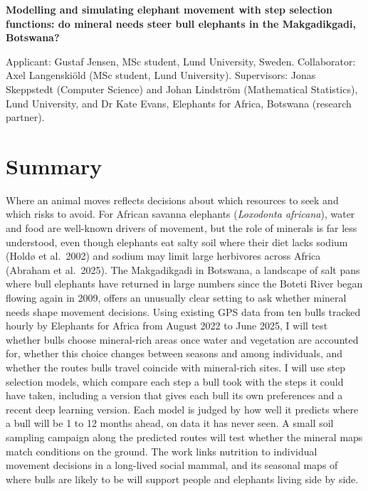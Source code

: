 \documentclass[11pt,a4paper]{article}
\begin{document}
{\bfseries Modelling and simulating elephant movement with step selection functions: do mineral needs steer bull elephants in the Makgadikgadi, Botswana?\par}
\vspace{2pt}
Applicant: Gustaf Jensen, MSc student, Lund University, Sweden. Collaborator: Axel Langenskiöld (MSc student, Lund University). Supervisors: Jonas Skeppstedt (Computer Science) and Johan Lindström (Mathematical Statistics), Lund University, and Dr Kate Evans, Elephants for Africa, Botswana (research partner).

\section{Summary}
Where an animal moves reflects decisions about which resources to seek and which risks to avoid. For African savanna elephants (\textit{Loxodonta africana}), water and food are well-known drivers of movement, but the role of minerals is far less understood, even though elephants eat salty soil where their diet lacks sodium (Holdø et al.\ 2002) and sodium may limit large herbivores across Africa (Abraham et al.\ 2025). The Makgadikgadi in Botswana, a landscape of salt pans where bull elephants have returned in large numbers since the Boteti River began flowing again in 2009, offers an unusually clear setting to ask whether mineral needs shape movement decisions. Using existing GPS data from ten bulls tracked hourly by Elephants for Africa from August 2022 to June 2025, I will test whether bulls choose mineral-rich areas once water and vegetation are accounted for, whether this choice changes between seasons and among individuals, and whether the routes bulls travel coincide with mineral-rich sites. I will use step selection models, which compare each step a bull took with the steps it could have taken, including a version that gives each bull its own preferences and a recent deep learning version. Each model is judged by how well it predicts where a bull will be 1 to 12 months ahead, on data it has never seen. A small soil sampling campaign along the predicted routes will test whether the mineral maps match conditions on the ground. The work links nutrition to individual movement decisions in a long-lived social mammal, and its seasonal maps of where bulls are likely to be will support people and elephants living side by side.
\end{document}
